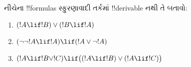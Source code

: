 \documentclass[../../../include/open-logic-section]{subfiles}
\begin{document}
\begin{prob}
  નીચેના !!{formula}s સ્ફુરણાવાદી તર્કમાં !!{derivable}
  નથી તે બતાવો:
  \begin{enumerate}
    \item $(!A \lif !B) \lor (!B \lif !A)$
    \item $(\lnot\lnot !A \lif !A) \lif (!A \lor \lnot !A)$
    \item $(!A \lif !B \lor !C) \lif \bigl((!A \lif !B)\lor(!A \lif !C)\bigr)$
  \end{enumerate}
\end{prob}
\end{document}
